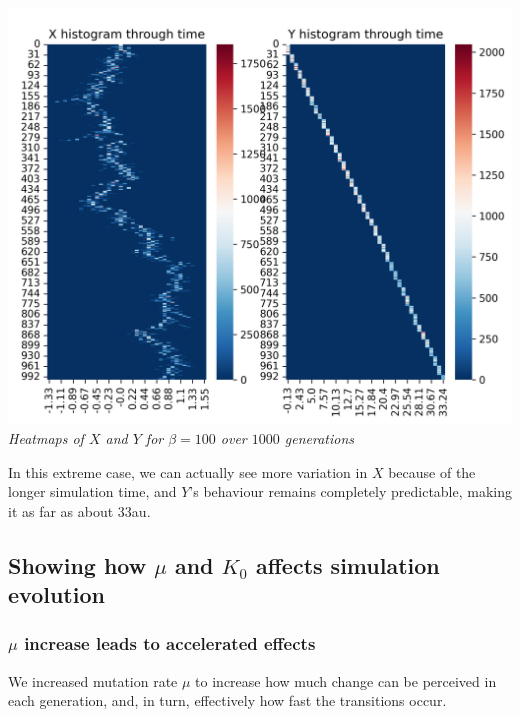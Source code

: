 \documentclass{article}
\begin{document}
\begin{center}
\includegraphics[scale=0.5]{beta=100}
\textit{Heatmaps of $X$ and $Y$ for $\beta = 100$ over $1000$ generations}
\end{center}

In this extreme case, we can actually see more variation in $X$ because of the longer simulation time, and $Y$'s behaviour remains completely predictable, making it as far as about $33$au.

\subsection{Showing how $\mu$ and $K_0$ affects simulation evolution}

\subsubsection{$\mu$ increase leads to accelerated effects}
We increased mutation rate $\mu$ to increase how much change can be perceived in each generation, and, in turn, effectively how fast the transitions occur. \\
\vspace{5mm}
\end{document}
